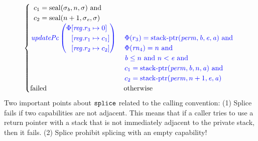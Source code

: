 \documentclass[a4paper]{article}
\begin{document}
\begin{align*}
\begin{cases}
\begin{array}[t]{l}
                                   c_1 = \seal{\sigma_\baddr,n,\sigma} \tand \\
                                   c_2 = \seal{n+1,\sigma_\eaddr,\sigma}
                                 \end{array}\\
                                   \sourcecolor\left.
                                   \updPcAddr{}\left(
                                   \arraycolsep=0pt
                                   \begin{array}{rl}
                                     \Phi&\updReg{r_3}{0}\\
                                               &\updReg{r_1}{c_1}\\
                                               &\updReg{r_2}{c_2}
                                   \end{array} \right)\right.
&
                                 \sourcecolor\left.
                                 \arraycolsep=0pt
                                 \begin{array}[t]{l}
                                   \Phi(r_3) = \stkptr{\perm,\baddr,\eaddr,\aaddr} \tand \\
                                   \Phi(\rn_4) = n \tand \\
                                   \baddr \leq n \tand n < \eaddr \tand \\
                                   c_1 = \stkptr{\perm,\baddr,n,\aaddr} \tand \\
                                   c_2 = \stkptr{\perm,n+1,\eaddr,\aaddr}
                                 \end{array} \right.\\
                                 \failed & \totherwise
                               \end{cases}
\end{align*}
Two important points about $\tsplice{}{}{}$ related to the calling convention: (1) Splice fails if two capabilities are not adjacent.
This means that if a caller tries to use a return pointer with a stack that is not immediately adjacent to the private stack, then it fails.
(2) Splice prohibit splicing with an empty capability!
\end{document}
